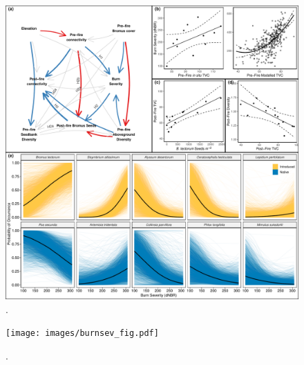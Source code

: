 \documentclass[
  12pt,
]{article}
\begin{document}
\begin{figure}
\centering
\includegraphics{images/big_plot_v2.pdf}
\caption{.}
\end{figure}

\begin{figure}
\centering
\texttt{[image: images/burnsev\_fig.pdf]}
\caption{.}
\end{figure}
\end{document}
